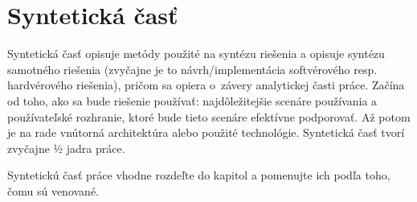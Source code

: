 
\chapter{Syntetická časť}
\label{methodology}

Syntetická časť opisuje metódy použité na syntézu riešenia a opisuje syntézu samotného riešenia (zvyčajne je to návrh/implementácia softvérového resp. hardvérového riešenia), pričom sa opiera o~závery analytickej časti práce. Začína od toho, ako sa bude riešenie používať: najdôležitejšie scenáre používania a používateľské rozhranie, ktoré bude tieto scenáre efektívne podporovať. Až potom je na rade vnútorná architektúra alebo použité technológie. Syntetická časť tvorí zvyčajne ½ jadra práce.

Syntetickú časť práce vhodne rozdeľte do kapitol a pomenujte ich podľa toho, čomu sú venované.
